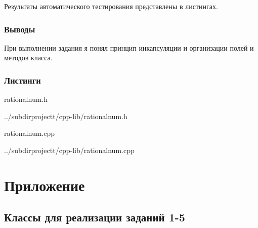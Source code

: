 \documentclass[12pt,a4paper]{report}
\begin{document}
Результаты автоматического тестирования представлены в листингах.

\subsection{Выводы}

При выполнении задания я понял принцип инкапсуляции и организации полей и методов класса.

\subsection*{Листинги}
rationalnum.h

{../subdirprojectt/cpp-lib/rationalnum.h}

\vspace{\baselineskip}

rationalnum.cpp

{../subdirprojectt/cpp-lib/rationalnum.cpp}

\chapter {Приложение}
\section{Классы для реализации заданий 1-5}
\end{document}
